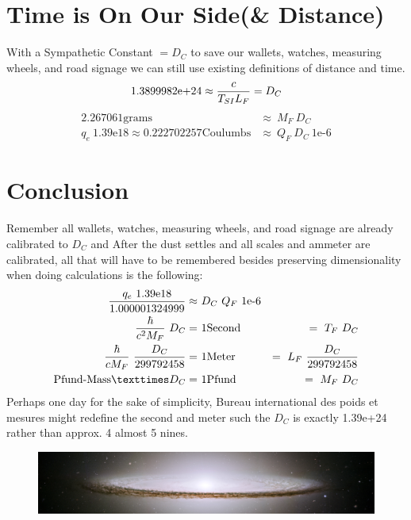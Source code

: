 \begin{multicols}{2}
\section{Time is On Our Side(\& Distance)}%
With a Sympathetic Constant $=D_C$ to save our wallets, watches, measuring wheels, and road signage we can still use existing definitions of distance and time. 
$$\text{1.3899982e+24} \approx {c\over T_{SI}L_F}=D_C$$
\begin{align*}
2.267061 \text{grams} &\approx~M_F~D_C\\
q_e~\text{1.39e18} \approx 0.222702257 \text{Coulumbs} &\approx~Q_F~D_C ~\text{1e-6}
\end{align*}
\section{Conclusion}
Remember all wallets, watches, measuring wheels, and road signage are already calibrated to $D_C$ and After the dust settles and all scales and ammeter are calibrated, all that will have to be remembered besides preserving dimensionality when doing calculations is the following:
\begin{align*}
{q_e~\text{1.39e18}\over 1.000001324999} \approx&~D_C ~Q_F~\text{1e-6}&\\
{\hbar \over c^2 M_F}~D_C =& ~1 \text{Second} &=~T_F~D_C \\
 {\hbar \over c M_F}~{D_C\over 299792458} =& ~1 \text{Meter} &=~L_F~{D_C\over 299792458} \\
\text{Pfund-Mass}×D_C=& ~1\text{Pfund} &=~M_F~D_C
\end{align*}
Perhaps one day for the sake of simplicity, Bureau international des poids et mesures might redefine the second and meter such the $D_C$ is exactly 1.39e+24 rather than approx. 4 almost 5 nines.

\pagebreak
\end{multicols}
\begin{figure}[h]
  \centering
  \includegraphics[width=\textwidth]{UWsombrero.jpg}
\end{figure}
